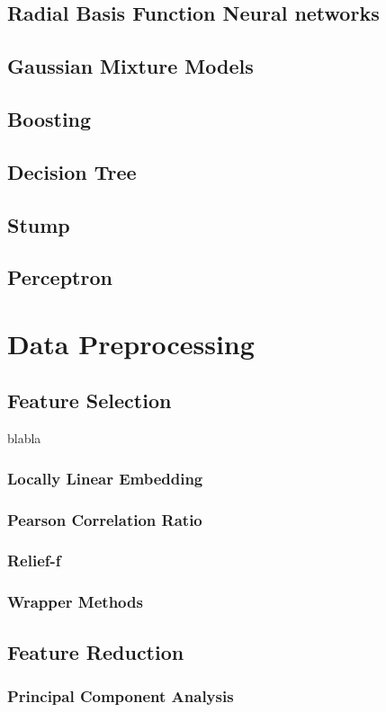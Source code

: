 \documentclass[11pt]{article}
\begin{document}
\subsection{Radial Basis Function Neural networks}
\subsection{Gaussian Mixture Models}
\subsection{Boosting}
\subsection{Decision Tree}
\subsection{Stump}
\subsection{Perceptron}

\section{Data Preprocessing}
\subsection{Feature Selection}
blabla
\subsubsection{Locally Linear Embedding}
\subsubsection{Pearson Correlation Ratio}
\subsubsection{Relief-f}
\subsubsection{Wrapper Methods}

\subsection{Feature Reduction}
\subsubsection{Principal Component Analysis}
\end{document}
